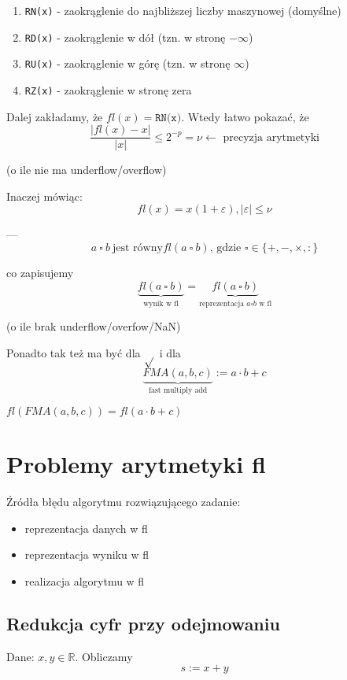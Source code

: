 \documentclass[hidelinks,a4paper,fleqn,oneside]{book}
\newcommand{\RR}{\mathbb{R}}
\begin{document}
\begin{enumerate}
	\item \texttt{RN(x)} - zaokrąglenie do najbliższej liczby maszynowej (domyślne)
	\item \texttt{RD(x)} - zaokrąglenie w dół (tzn. w stronę $-\infty$)
	\item \texttt{RU(x)} - zaokrąglenie w górę (tzn. w stronę $\infty$)
	\item \texttt{RZ(x)} - zaokrąglenie w stronę zera
\end{enumerate}

Dalej zakładamy, że $fl(x) = \texttt{RN(x)}$. Wtedy łatwo pokazać, że 
\[
	\frac{|fl(x) - x|}{|x|} \leq 2^{-p} = \nu \leftarrow \textrm{ precyzja arytmetyki}
\]

(o ile nie ma underflow/overflow)

Inaczej mówiąc:
\[
	fl(x) = x(1 + \varepsilon), |\varepsilon| \leq \nu
\]

---
\[
	a\ \square\ b\ \textrm{jest równy} fl(a\ \square\ b)\textrm{, gdzie }\square \in \{+, -, \times, :\}
\]

co zapisujemy
\[
	\underbrace{fl(a\ \square\ b)}_{\textrm{wynik w fl}} = \underbrace{fl(a\ \square\ b)}_{\textrm{reprezentacja } a \square b \textrm{ w fl}}
\]

(o ile brak underflow/overfow/NaN)

Ponadto tak też ma być dla $\sqrt{}$ i dla
\[
	\underbrace{FMA(a, b, c)}_{\textrm{fast multiply add}} := a \cdot b + c
\]

$fl(FMA(a, b, c)) = fl(a \cdot b + c)$

\section{Problemy arytmetyki fl}

Źródła błędu algorytmu rozwiązującego zadanie:
\begin{itemize}
	\item reprezentacja danych w fl
	\item reprezentacja wyniku w fl
	\item realizacja algorytmu w fl
\end{itemize}


\subsection{Redukcja cyfr przy odejmowaniu}

Dane: $x, y \in \RR$. Obliczamy
\[
	s := x + y
\]
\end{document}
